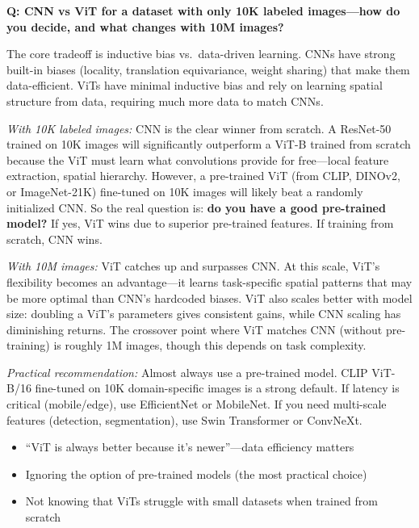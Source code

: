 \begin{interviewq}
\textbf{Q: CNN vs ViT for a dataset with only 10K labeled images---how do you decide, and what changes with 10M images?}

 \quad {} \quad \badgefreq{\freqhigh}

\stronganswer The core tradeoff is inductive bias vs.\ data-driven learning. CNNs have strong built-in biases (locality, translation equivariance, weight sharing) that make them data-efficient. ViTs have minimal inductive bias and rely on learning spatial structure from data, requiring much more data to match CNNs.

\textit{With 10K labeled images:} CNN is the clear winner from scratch. A ResNet-50 trained on 10K images will significantly outperform a ViT-B trained from scratch because the ViT must learn what convolutions provide for free---local feature extraction, spatial hierarchy. However, a pre-trained ViT (from CLIP, DINOv2, or ImageNet-21K) fine-tuned on 10K images will likely beat a randomly initialized CNN. So the real question is: \textbf{do you have a good pre-trained model?} If yes, ViT wins due to superior pre-trained features. If training from scratch, CNN wins.

\textit{With 10M images:} ViT catches up and surpasses CNN. At this scale, ViT's flexibility becomes an advantage---it learns task-specific spatial patterns that may be more optimal than CNN's hardcoded biases. ViT also scales better with model size: doubling a ViT's parameters gives consistent gains, while CNN scaling has diminishing returns. The crossover point where ViT matches CNN (without pre-training) is roughly 1M images, though this depends on task complexity.

\textit{Practical recommendation:} Almost always use a pre-trained model. CLIP ViT-B/16 fine-tuned on 10K domain-specific images is a strong default. If latency is critical (mobile/edge), use EfficientNet or MobileNet. If you need multi-scale features (detection, segmentation), use Swin Transformer or ConvNeXt.

\redflags
\begin{itemize}
    \item ``ViT is always better because it's newer''---data efficiency matters
    \item Ignoring the option of pre-trained models (the most practical choice)
    \item Not knowing that ViTs struggle with small datasets when trained from scratch
\end{itemize}


\end{interviewq}

